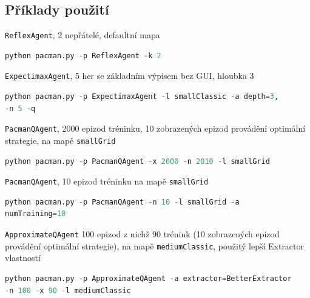 \subsection{Příklady použití}
\texttt{ReflexAgent}, 2 nepřátelé, defaultní mapa
\begin{lstlisting}[language=Python,texcl=true]
python pacman.py -p ReflexAgent -k 2
\end{lstlisting}
\texttt{ExpectimaxAgent}, 5 her se základním výpisem bez GUI, hloubka 3
\begin{lstlisting}[language=Python,texcl=true]
python pacman.py -p ExpectimaxAgent -l smallClassic -a depth=3,
-n 5 -q
\end{lstlisting}
\texttt{PacmanQAgent}, 2000 epizod tréninku, 10 zobrazených epizod provádění optimální strategie, na mapě \texttt{smallGrid}
\begin{lstlisting}[language=Python,texcl=true]
python pacman.py -p PacmanQAgent -x 2000 -n 2010 -l smallGrid
\end{lstlisting}
\texttt{PacmanQAgent}, 10 epizod tréninku na mapě \texttt{smallGrid}
\begin{lstlisting}[language=Python,texcl=true]
python pacman.py -p PacmanQAgent -n 10 -l smallGrid -a
numTraining=10
\end{lstlisting}
\texttt{ApproximateQAgent} 100 epizod z nichž 90 trénink (10 zobrazených epizod provádění optimální strategie), na mapě \texttt{mediumClassic}, použitý lepší Extractor vlastností
\begin{lstlisting}[language=Python,texcl=true]
python pacman.py -p ApproximateQAgent -a extractor=BetterExtractor
-n 100 -x 90 -l mediumClassic
\end{lstlisting}

